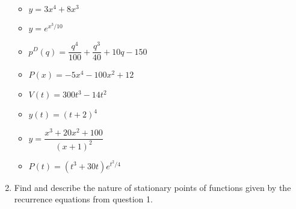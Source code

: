 \documentclass[11pt,a4paper]{article}
\theoremstyle{break}
\theoremstyle{break}
\begin{document}
\begin{enumerate}
\begin{itemize}
	\item $y = 3x^{4} + 8x^{3}$
	\item $y = e^{x^3/10}$
	\item $p^D(q) = \dfrac{q^4}{100} + \dfrac{q^3}{40} + 10q - 150$
	\item $P(x) = -5x^4 - 100x^2 + 12$
	\item $V(t) = 300t^3 - 14t^2$
	\item $y(t) = (t+2)^4$
	\item $y = \dfrac{x^3 + 20x^2 + 100}{(x+1)^2}$
	\item $P(t) = (t^3 + 30t)e^{t^2/4}$
\end{itemize}
\item Find and describe the nature of stationary points of functions given by the recurrence equations from question 1.
\end{enumerate}
\end{document}
